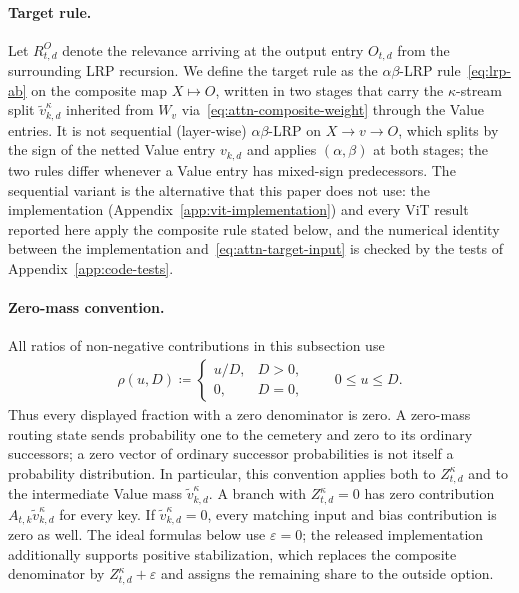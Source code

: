 \documentclass[twoside]{article}
\newif\ifch \chfalse
\newcommand{\ch}[1]{\ifch\textcolor{magenta}{#1}\else#1\fi}
\newcommand{\1}{\mathbf{1}}
\begin{document}
\paragraph{Target rule.} Let $R^O_{t,d}$ denote the relevance arriving at the output entry $O_{t,d}$ from the surrounding
LRP recursion. We define the target rule as the $\alpha\beta$-\ac{LRP} \ch{rule~\eqref{eq:lrp-ab}} on the
composite map $X \mapsto O$, written in two stages that carry the $\kappa$-stream split $\tilde
    v_{k,d}^\kappa$ inherited from $W_v$ via~\eqref{eq:attn-composite-weight} through the Value
entries. \ch{It is not sequential (layer-wise) $\alpha\beta$-\ac{LRP} on $X \to v \to O$, which splits
by the sign of the netted Value entry $v_{k,d}$ and applies $(\alpha,\beta)$ at both stages; the two
rules differ whenever a Value entry has mixed-sign predecessors. The sequential variant is the
alternative that this paper does not use: the implementation (Appendix~\ref{app:vit-implementation})
and every ViT result reported here apply the composite rule stated below, and the numerical
identity between the implementation and~\eqref{eq:attn-target-input} is checked by the tests of
Appendix~\ref{app:code-tests}.}

\paragraph{Zero-mass convention.}
All ratios of non-negative contributions in this subsection use
\begin{align}\label{eq:attn-zero-ratio}
    \rho(u,D)\coloneqq
    \begin{cases}u/D,&D>0,\\0,&D=0,\end{cases}
    \qquad 0\leq u\leq D.
\end{align}
Thus every displayed fraction with a zero denominator is zero. A zero-mass routing state sends
probability one to the cemetery and zero to its ordinary successors; a zero vector of ordinary
successor probabilities is not itself a probability distribution. In particular, this convention
applies both to $Z_{t,d}^\kappa$ and to the intermediate Value mass $\tilde v_{k,d}^\kappa$.
A branch with $Z_{t,d}^\kappa=0$ has zero contribution $A_{t,k}\tilde v_{k,d}^\kappa$ for every
key. If $\tilde v_{k,d}^\kappa=0$, every matching input and bias contribution is zero as well.
The ideal formulas below use $\varepsilon=0$; the released implementation additionally supports
positive stabilization, which replaces the composite denominator by $Z_{t,d}^\kappa+\varepsilon$
and assigns the remaining share to the outside option.
\end{document}
